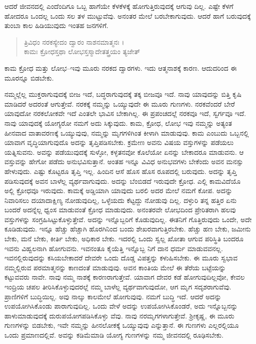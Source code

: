 ಆದರೆ ಜೀವನದಲ್ಲಿ ಎಂದೆಂದಿಗೂ ಒಬ್ಬ ಹಾಗೆಯೇ ಕೆಳಕೆಳಕ್ಕೆ ಹೋಗುತ್ತಿರುವುದಕ್ಕೆ ಆಗುವು ದಿಲ್ಲ. ಎಷ್ಟೇ ಕೆಳಗೆ ಹೋದರೂ ಒಂದಲ್ಲ ಒಂದು ಸಲ ತಳ ಮುಟ್ಟುವೆವು. ಅನಂತರ ಮೇಲೆ ಬರಬೇಕಾಗುವುದು. ಆದರೆ ಹಾಗೆ ಬರುವುದಕ್ಕೆ ತುಂಬಾ ಕಾಲ ಹಿಡಿಯುವುದು ಇಂತಹ ಜನಗಳಿಗೆ.

\begin{verse}
ತ್ರಿವಿಧಂ ನರಕಸ್ಯೇದಂ ದ್ವಾರಂ ನಾಶನಮಾತ್ಮನಃ ।\\ಕಾಮಃ ಕ್ರೋಧಸ್ತಥಾ ಲೋಭಸ್ತಸ್ಮಾದೇತತ್ತ್ರಯಂ ತ್ಯಜೇತ್ 
\end{verse}

{\small ಕಾಮ ಕ್ರೋಧ ಮತ್ತು ಲೋಭ--ಇವು ಮೂರು ನರಕದ ದ್ವಾರಗಳು. ಇದು ಆತ್ಮನಾಶಕ್ಕೆ ಕಾರಣ. ಆದುದರಿಂದ ಈ ಮೂರನ್ನೂ ಬಿಡಬೇಕು.}

ನಮ್ಮಲ್ಲೆಲ್ಲ ಮುಕ್ತರಾಗುವುದಕ್ಕೆ ಬೀಜ ಇದೆ, ಬದ್ಧರಾಗುವುದಕ್ಕೆ ತಕ್ಕ ಬೀಜವೂ ಇದೆ. ನಾವು ಯಾವುದನ್ನು ಬಿತ್ತಿ ಕೃಷಿ ಮಾಡಿದರೆ ಅದರಂತೆ ಆಗುತ್ತೇವೆ. ನರಕಕ್ಕೆ ನಮ್ಮನ್ನು ಒಯ್ಯುವುದೇ ಈ ಮೂರು ಗುಣಗಳು. ನರಕವೆಂದರೆ ಬೇರೆ ಯಾವುದೋ ನರಕಲೋಕವೇ ಇದೆ ಎಂತಲೇ ಭಾವಿಸ ಬೇಕಾಗಿಲ್ಲ. ಈ ಪ್ರಪಂಚದಲ್ಲೆ ನರಕವೂ ಇದೆ, ಸ್ವರ್ಗವೂ ಇದೆ. ನಾವು ಯಾವುದಕ್ಕೆ ಯೋಗ್ಯರೋ ನಮಗೆ ಅದು ಸಿಕ್ಕುವುದು. ಕಾಮ, ಕ್ರೋಧ, ಲೋಭ ಇವು ನಮ್ಮನ್ನು ಅತ್ಯಂತ ಹೀನವಾದ ವಾತಾವರಣಕ್ಕೆ ಒಯ್ಯುವುವು, ನಮ್ಮನ್ನು ಮೃಗಗಳಿಗಿಂತ ಕೀಳಾಗಿ ಮಾಡುವುವು. ಕಾಮ ಎಂಬುದು ಒಬ್ಬನಲ್ಲಿ ಯಾವಾಗ ವೃದ್ಧಿಯಾಗುವುದೊ ಅದನ್ನು ತೃಪ್ತಿಪಡಿಸಬೇಕು. ಕ್ರಮೇಣ ಅವನು ವಿಷಯ ವಸ್ತುಗಳನ್ನು ಪಡೆಯಲು ಯತ್ನಿಸುವನು. ಅವನ್ನು ಪಡೆಯುವುದಕ್ಕೆ ಸುಳ್ಳೋ, ಕಳ್ಳತನವೋ ಕೊಲೆಯೋ ಏನನ್ನು ಬೇಕಾದರೂ ಮಾಡುವನು. ಆ ವಸ್ತುವನ್ನು ಹೇಗೋ ಪಡೆದು ಅನುಭವಿಸುತ್ತಾನೆ. ಅಂತಹ ಇನ್ನೂ ವಿವಿಧ ಅನುಭವಗಳು ಬೇಕೆಂದು ಅವನ ಮನಸ್ಸು ಹೇಳುವುದು. ಎಷ್ಟು ಕೊಟ್ಟರೂ ತೃಪ್ತಿ ಇಲ್ಲ. ಹಿಂದಿನ ಆಸೆ ಹೊಸ ಹೊಸ ರೂಪದಲ್ಲಿ ಬರುವುದು. ಅದನ್ನು ತೃಪ್ತಿ ಪಡಿಸುವುದಕ್ಕೆ ಅವನ ಬಾಳೆಲ್ಲ ವ್ಯರ್ಥವಾಗುವುದು. ಅದನ್ನು ಬೆಂಬಿಡದೆ ಇರುವುದೇ ಕ್ರೋಧ. ಎಲ್ಲಿ ಕಾಮವಿದೆಯೊ ಅಲ್ಲಿ ಕ್ರೋಧವೂ ಇರುವುದು. ಕಾಮಕ್ಕೆ ಅಡ್ಡಿಯಾಗಿ ಯಾವುದು ಬರಲಿ ಅದರ ಮೇಲೆ ನಮಗೆ ಕೋಪ. ಅದನ್ನು ನಿವಾರಿಸಲು ದಯಾದಾಕ್ಷಿಣ್ಯ ನೋಡುವುದಿಲ್ಲ, ಒಳ್ಳೆಯದು ಕೆಟ್ಟದ್ದು ನೋಡುವು ದಿಲ್ಲ. ದಳ್ಳುರಿ ತನ್ನ ಹತ್ತಿರ ಏನು ಬಂದರೆ ಅದನ್ನೆಲ್ಲ ಧ್ವಂಸ ಮಾಡುವಂತೆ ಕ್ರೋಧ ಮಾಡುವುದು. ಅನಂತರವೇ ಲೋಭದಿಂದ ಪ್ರೇರಿತರಾಗಿ ಹಲವು ವಸ್ತುಗಳನ್ನು ಸಂಗ್ರಹಿಸಿಟ್ಟುಕೊಳ್ಳುತ್ತೇವೆ. ಅದನ್ನು ಇನ್ನೊಬ್ಬರಿಗೆ ಕೊಡುವುದಿಲ್ಲ. ಈತನಿಗೆ ಗೊತ್ತಿರುವುದು ಒಂದೇ, ಅದೇ ಕೂಡಿಡುವುದು. ಇನ್ನೂ ಹೆಚ್ಚು ಹೆಚ್ಚಾಗಿ ಹೊರಗಿನಿಂದ ಬಂದು ಶೇಖರವಾಗುತ್ತಿರಬೇಕು. ಹೆಚ್ಚು ಹಣ ಬೇಕು, ಜಮೀನು ಬೇಕು, ಮನೆ ಬೇಕು, ಕೀರ್ತಿ ಬೇಕು, ಅಧಿಕಾರ ಬೇಕು. ಇದರಲ್ಲಿ ಒಂದು ಸ್ವಲ್ಲ ಖೋತಾ ಆಗುವ ಪರಿಸ್ಥಿತಿ ಬಂದರೂ ಇವನು ವಿಹ್ವಲನಾಗಿ ಹೋಗುವನು. ಇವನಂತೂ ಕೈಯೆತ್ತಿ ಇನ್ನೊಬ್ಬ ನಿಗೆ ದಾನ ಧರ್ಮ ಮಾಡುವವನಲ್ಲ. ಇವನಲ್ಲಿರುವುದನ್ನು ಕಸಿಯಬೇಕಾದರೆ ದೇವರೇ ಒಂದು ದೊಡ್ಡ ವಿಪತ್ತನ್ನು ಕಳುಹಿಸಬೇಕು. ಈ ಮೂರು ಸ್ವಭಾವ ನಮ್ಮಲ್ಲಿರುವ ಪರಮಾತ್ಮನನ್ನು ಕಾಣದಂತೆ ಮಾಡುವುವು. ಅವನ ಕಾಂತಿಯ ಮೇಲೆ ಈ ತೆರೆಯ ಬಟ್ಟೆಯನ್ನು ಕಟ್ಟುವವರು ನಾವೇ. ನಾವು ನಮ್ಮ ನಾಶಕ್ಕೆ ಕಾರಣರಾಗುತ್ತೇವೆ. ಯಾವಾಗ ದೇವರ ಕಡೆ ಹೋಗುವುದಿಲ್ಲವೋ, ಕೇವಲ ಇಂದ್ರಿಯ ಚಪಲ ತೀರಿಸಿಕೊಳ್ಳುವುದರಲ್ಲೆ ನಮ್ಮ ಬಾಳೆಲ್ಲ ವ್ಯರ್ಥವಾಗುವುದೋ, ಆಗ ಮೃಗ ಸದೃಶರಾಗುವೆವು. ಪ್ರಾಣಿಗಳಿಗೆ ಬುದ್ಧಿಯಿಲ್ಲ. ಅವು ನಾಲ್ಕು ಕಾಲಮೇಲೆ ಹೋಗುವುವು. ನಮಗೆ ಬುದ್ಧಿ ಇದೆ. ಆದರೆ ಅದನ್ನು ಉಪಯೋಗಿಸಿಕೊಂಡು ಪಾರಾಗುವುದಿಲ್ಲ. ಒಂದು ವೇಳೆ ಅದನ್ನು ಉಪಯೋಗಿಸಿಕೊಂಡರೆ, ಅದು ಇನ್ನೊಬ್ಬನನ್ನು ಹಾಳುಮಾಡುವುದಕ್ಕೆ ದುರುಪಯೋಗಪಡಿಸಿಕೊಳ್ಳು ವೆವು. ನಾವು ನರಮೃಗಗಳಾಗುತ್ತೇವೆ. ಶ್ರೀಕೃಷ್ಣ, ಈ ಮೂರು ಗುಣಗಳನ್ನು ಬಿಡಬೇಕು, ಇವೇ ನಮ್ಮನ್ನು ಹೀನಲೋಕಕ್ಕೆ ಒಯ್ಯುವುವು ಎನ್ನುತ್ತಾನೆ. ಈ ಗುಣಗಳು ಎಲ್ಲರಲ್ಲಿಯೂ ಒಂದು ಪ್ರಮಾಣದಲ್ಲಿವೆ. ಅವನ್ನು ಕಡಿಮೆಮಾಡಿ ಯೋಗ್ಯ ಗುಣಗಳನ್ನು ನಮ್ಮ ಜೀವನದಲ್ಲಿ ರೂಢಿಸಬೇಕು.


